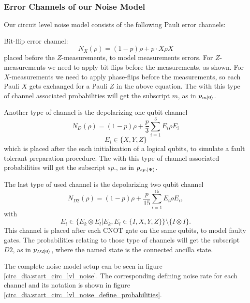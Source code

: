 \subsubsection{Error Channels of our Noise Model}\label{sssec:error_channel_noise_model}
Our circuit level noise model consists of the following Pauli error channels:

Bit-flip error channel:
\begin{equation}
    N_{X}(\rho) = (1-p) \rho + p \cdot X \rho X
\end{equation}
placed before the $Z$-measurements, to model measurements errors.
For $Z$-measurements we need to apply bit-flips before the measurements, as shown. 
For $X$-measurements we need to apply phase-flips before the measurements, so each Pauli $X$ gets exchanged for a Pauli $Z$ in the above equation.
The with this type of channel associated probabilities will get the subscript $m$, as in $p_{m\ket{0}}$.

Another type of channel is the depolarizing one qubit channel
\begin{equation}
    N_{D}(\rho) = (1-p) \rho + \frac{p}{3} \sum^3_{i=1} E_i \rho E_i
\end{equation}
\begin{equation*}
    E_i \in \{ X, Y, Z \}
\end{equation*}
which is placed after the each initialization of a logical qubits, to simulate a fault tolerant preparation procedure.
The with this type of channel associated probabilities will get the subscript $sp.$, as in $p_{sp.\ket{\Psi}}$.

The last type of used channel is the depolarizing two qubit channel
\begin{equation}
    N_{D2}(\rho) = (1-p) \rho + \frac{p}{15} \sum_{i=1}^{15} E_i \rho E_i,
\end{equation}
with
\begin{equation*}
    E_i \in \{E_k \otimes E_l | E_k,E_l \in \{I,X,Y,Z\} \} \setminus \{I\otimes  I\}.
\end{equation*}
This channel is placed after each CNOT gate on the same qubits, to model faulty gates.
The probabilities relating to those type of channels will get the subscript $D2$, as in $p_{D2\ket{0}}$, where the named state is the connected ancilla state.

The complete noise model setup can be seen in figure \ref{circ_dia:start_circ_lvl_noise}.
The corresponding defining noise rate for each channel and its notation is shown in figure \ref{circ_dia:start_circ_lvl_noise_define_probabilities}.

